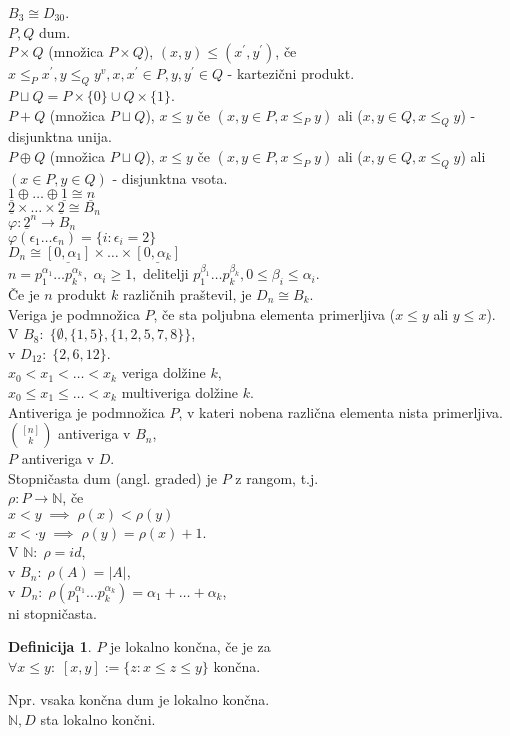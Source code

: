 \documentclass[a4paper, 12pt]{book}
\theoremstyle{definition}
\newtheorem{defn}[counter]{Definicija}
\theoremstyle{remark}
\newcommand{\N}{\mathbb{N}}
\begin{document}
$B_3 \cong D_{30}$. \\
$P, Q$ dum. \\
$P \times Q$ (množica $P \times Q$), $(x,y) \leq (x^{'},y^{'})$, če $x \leq_P x^{'},
y \leq_Q y^v, x, x^{'} \in P, y, y^{'} \in Q$ - kartezični produkt. \\
$P \sqcup Q = P \times \{0\} \cup Q \times \{1\}$. \\
$P + Q$ (množica $P \sqcup Q$), $x \leq y$ če $(x,y \in P, x \leq_P y)$ ali ($x,y \in Q, x \leq_Q y$)
- disjunktna unija. \\
$P \oplus Q$ (množica $P \sqcup Q$), $x \leq y$ če $(x,y \in P, x \leq_P y)$ ali ($x,y \in Q, x \leq_Q y$)
ali $(x \in P, y \in Q)$ - disjunktna vsota. \\
$\underline{1} \oplus \dots \oplus \underline{1} \cong \underline{n}$ \\
$\underline{2} \times \dots \times \underline{2} \cong B_n$ \\
$\varphi: \underline{2}^n \to B_n$ \\
$\varphi(\epsilon_1 \dots \epsilon_n) = \{i: \epsilon_i = 2\}$ \\
$D_n \cong \underline{[0, \alpha_1]} \times \dots \times \underline{[0, \alpha_k]}$ \\
$n = p_1^{\alpha_1} \dots p_k^{\alpha_k}, \; \alpha_i \geq 1,$ delitelji
$p_1^{\beta_1} \dots p_k^{\beta_k}, 0 \leq \beta_i \leq \alpha_i$. \\
Če je $n$ produkt $k$ različnih praštevil, je $D_n \cong B_k$. \\
Veriga je podmnožica $P$, če sta poljubna elementa primerljiva ($x \leq y$ ali $y \leq x$). \\
V $B_8: \; \{\emptyset, \{1, 5\}, \{1, 2, 5, 7, 8\}\}$, \\
v $D_12: \; \{2, 6, 12\}$. \\
$x_0 < x_1 < \dots < x_k$ veriga dolžine $k$, \\
$x_0 \leq x_1 \leq \dots < x_k$ multiveriga dolžine $k$. \\
Antiveriga je podmnožica $P$, v kateri nobena različna elementa nista primerljiva. \\
$\binom{[n]}{k}$ antiveriga v $B_n$, \\
$P$ antiveriga v $D$. \\
Stopničasta dum (angl. graded) je $P$ z rangom, t.j. \\
$\rho: P \to \N$, če \\
$x < y \; \implies \; \rho(x) < \rho(y)$ \\
$x <\cdot y \; \implies \; \rho(y) = \rho(x) + 1$. \\
V $\N: \; \rho = id$, \\
v $B_n: \; \rho(A) = |A|$, \\
v $D_n: \; \rho\left(p_1^{\alpha_1} \dots p_k^{\alpha_k}\right) = \alpha_1 + \dots + \alpha_k$, \\
ni stopničasta.
\begin{defn}
  $P$ je lokalno končna, če je za \\
  $\forall x \leq y: \; [x,y] := \{z: x \leq z \leq y\}$ končna.
\end{defn}
Npr. vsaka končna dum je lokalno končna. \\
$\N, D$ sta lokalno končni.
\end{document}

